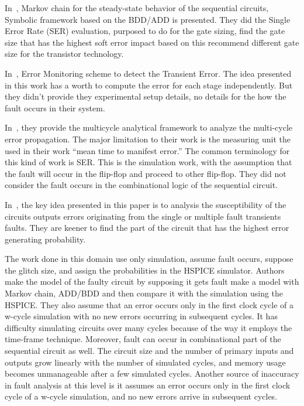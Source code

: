 In~\cite{miskov2008modeling}, Markov chain for the steady-state behavior of the sequential circuits, Symbolic framework
based on the BDD/ADD is presented. They did the Single Error Rate (SER) evaluation, purposed to do
for the gate sizing, find the gate size that has the highest soft error impact based on this recommend
different gate size for the transistor technology. 
 




In~\cite{das2007monitoring}, Error Monitoring scheme to detect the Transient Error. The idea presented in this work has a worth to compute the error for each stage
independently. But they didn't provide they experimental setup details, no details for the how the fault
occurs in their system.

In~\cite{asadi2005soft}, they provide the multicycle analytical framework to analyze the multi-cycle error
propagation. The major limitation to their work is the measuring unit the used in their work “mean time
to manifest error.” The common terminology for this kind of work is SER. This is the simulation work,
with the assumption that the fault will occur in the flip-flop and proceed to other flip-flop. They did not
consider the fault occurs in the combinational logic of the sequential circuit.

In~\cite{miskov2010multiple}, the key idea presented in this paper is to analysis the susceptibility of the circuits outputs
errors originating from the single or multiple fault transients faults. They are keener to find the part of
the circuit that has the highest error generating probability.





The work done in this domain use only simulation, assume fault occurs, suppose the glitch size, and assign the
probabilities in the HSPICE simulator. Authors make the model of the faulty circuit by supposing it gets
fault make a model with Markov chain, ADD/BDD and then compare it with the simulation using the
HSPICE. They also assume that an error occurs only in the first clock cycle of a w-cycle simulation with
no new errors occurring in subsequent cycles. It has difficulty simulating circuits over many cycles
because of the way it employs the time-frame technique. Moreover, fault can occur in combinational part of the sequential circuit as well. The circuit size and the number of primary
inputs and outputs grow linearly with the number of simulated cycles, and memory usage becomes
unmanageable after a few simulated cycles. Another source of inaccuracy in fault analysis at this level is it
assumes an error occurs only in the first clock cycle of a w-cycle simulation, and no new errors arrive in
subsequent cycles.












\label{related}





